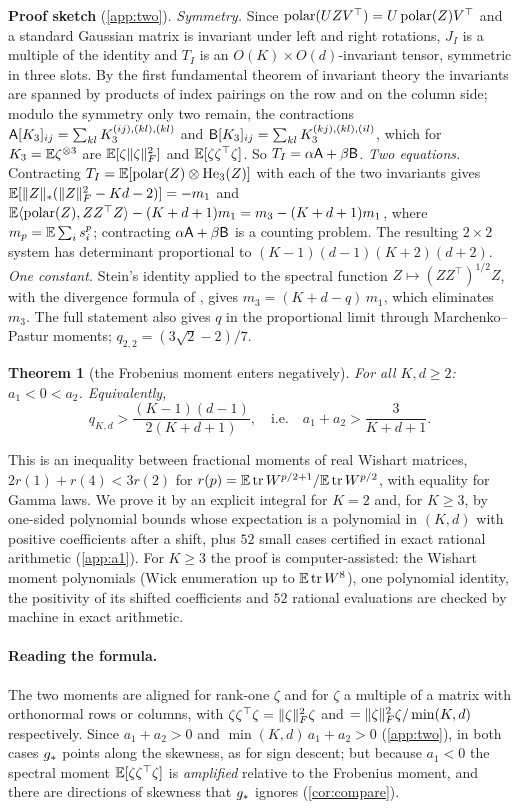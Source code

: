 \documentclass{article}
\theoremstyle{plain}
\newtheorem{theorem}{Theorem}
\theoremstyle{definition}
\theoremstyle{remark}
\begin{document}
\textbf{Proof sketch} (\cref{app:two}). \emph{Symmetry.} Since $\operatorname{polar}(UZV^\top)=U\operatorname{polar}(Z)V^\top$ and a standard
Gaussian matrix is invariant under left and right rotations, $J_I$ is a multiple of the identity and $T_I$ is an
$O(K)\times O(d)$-invariant tensor, symmetric in three slots. By the first fundamental theorem of invariant theory
the invariants are spanned by products of index pairings on the row and on the column side; modulo the symmetry
only two remain, the contractions $\mathsf{A}[K_3]_{ij}=\sum_{kl}K_3^{(ij),(kl),(kl)}$ and
$\mathsf{B}[K_3]_{ij}=\sum_{kl}K_3^{(kj),(kl),(il)}$, which for $K_3=\mathbb{E}\zeta^{\otimes3}$ are $\mathbb{E}[\zeta\|\zeta\|_{F}^2]$ and
$\mathbb{E}[\zeta\zeta^\top\zeta]$. So $T_I=\alpha\mathsf{A}+\beta\mathsf{B}$. \emph{Two equations.} Contracting
$T_I=\mathbb{E}[\operatorname{polar}(Z)\otimes\mathrm{He}_3(Z)]$ with each of the two invariants gives
$\mathbb{E}[\|Z\|_{*}(\|Z\|_{F}^2-Kd-2)]=-m_1$ and $\mathbb{E}\langle \operatorname{polar}(Z), ZZ^\top Z\rangle-(K+d+1)m_1=m_3-(K+d+1)m_1$, where
$m_p=\mathbb{E}\sum_is_i^p$; contracting $\alpha\mathsf{A}+\beta\mathsf{B}$ is a counting problem. The resulting $2\times2$ system has determinant
proportional to $(K-1)(d-1)(K+2)(d+2)$. \emph{One constant.} Stein's identity applied to the spectral function
$Z\mapsto(ZZ^\top)^{1/2}Z$, with the divergence formula of \citet{candes}, gives $m_3=(K+d-q)\,m_1$, which eliminates
$m_3$. The full statement also gives $q$ in the proportional limit through Marchenko--Pastur moments;
$q_{2,2}=(3\sqrt2-2)/7$.

\begin{theorem}[the Frobenius moment enters negatively]\label{thm:a1}
For all $K,d\ge2$: $a_1<0<a_2$. Equivalently,
\[
q_{K,d}>\frac{(K-1)(d-1)}{2(K+d+1)},\quad\text{i.e.}\quad a_1+a_2>\frac3{K+d+1}.
\]
\end{theorem}

This is an inequality between fractional moments of real Wishart matrices,
$2r(1)+r(4)<3r(2)$ for $r(p)=\mathbb{E}\operatorname{tr} W^{p/2+1}/\mathbb{E}\operatorname{tr} W^{p/2}$, with equality for Gamma laws. We prove it by an explicit
integral for $K=2$ and, for $K\ge3$, by one-sided polynomial bounds whose expectation is a polynomial in $(K,d)$ with
positive coefficients after a shift, plus $52$ small cases certified in exact rational arithmetic (\cref{app:a1}).
For $K\ge3$ the proof is computer-assisted: the Wishart moment polynomials (Wick enumeration up to $\mathbb{E}\operatorname{tr} W^8$),
one polynomial identity, the positivity of its shifted coefficients and $52$ rational evaluations are checked by
machine in exact arithmetic.

\paragraph{Reading the formula.} The two moments are aligned for rank-one $\zeta$ and for $\zeta$ a multiple of a
matrix with orthonormal rows or columns, with $\zeta\zeta^\top\zeta=\|\zeta\|_{F}^2\zeta$ and $=\|\zeta\|_{F}^2\zeta/\min(K,d)$ respectively. Since
$a_1+a_2>0$ and $\min(K,d)\,a_1+a_2>0$ (\cref{app:two}), in both cases $g_\ast$ points along the skewness, as for sign
descent; but because $a_1<0$ the spectral moment $\mathbb{E}[\zeta\zeta^\top\zeta]$ is \emph{amplified} relative to the Frobenius
moment, and there are directions of skewness that $g_\ast$ ignores (\cref{cor:compare}).
\end{document}
